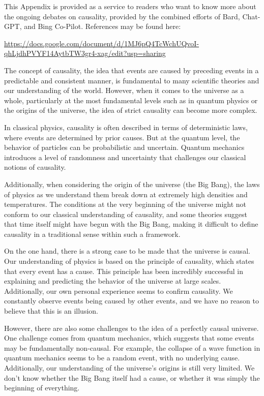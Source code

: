 \documentclass[10]{article}
\begin{document}
This Appendix is provided as a service to readers who want to know more
about the ongoing debates on causality, provided by the combined efforts
of Bard, Chat-GPT, and Bing Co-Pilot.
References may be found here:

{ \scriptsize
\url{https://docs.google.com/document/d/1MJ6pQ4TcWchUQvoI-qhLjdhPVYF14AytbTW3gr4-xag/edit?usp=sharing}
}

The concept of causality, the idea that events are caused by preceding
events in a predictable and consistent manner, is fundamental to many
scientific theories and our understanding of the world.
However, when it comes to the universe as a whole, particularly at the
most fundamental levels such as in quantum physics or the origins of
the universe, the idea of strict causality can become more complex.

In classical physics, causality is often described in terms of
deterministic laws, where events are determined by prior causes.
But at the quantum level, the behavior of particles can be probabilistic
and uncertain.
Quantum mechanics introduces a level of randomness and uncertainty that
challenges our classical notions of causality.

Additionally, when considering the origin of the universe (the Big Bang),
the laws of physics as we understand them break down at extremely high
densities and temperatures.
The conditions at the very beginning of the universe might not conform
to our classical understanding of causality, and some theories suggest
that time itself might have begun with the Big Bang, making it difficult
to define causality in a traditional sense within such a framework.

On the one hand, there is a strong case to be made that the universe
is causal.
Our understanding of physics is based on the principle of causality,
which states that every event has a cause.
This principle has been incredibly successful in explaining and predicting
the behavior of the universe at large scales.
Additionally, our own personal experience seems to confirm causality.
We constantly observe events being caused by other events, and we have
no reason to believe that this is an illusion.

However, there are also some challenges to the idea of a perfectly
causal universe.
One challenge comes from quantum mechanics, which suggests that some
events may be fundamentally non-causal.
For example, the collapse of a wave function in quantum mechanics seems
to be a random event, with no underlying cause.
Additionally, our understanding of the universe's origins is still
very limited.
We don't know whether the Big Bang itself had a cause, or whether it
was simply the beginning of everything.
\end{document}
